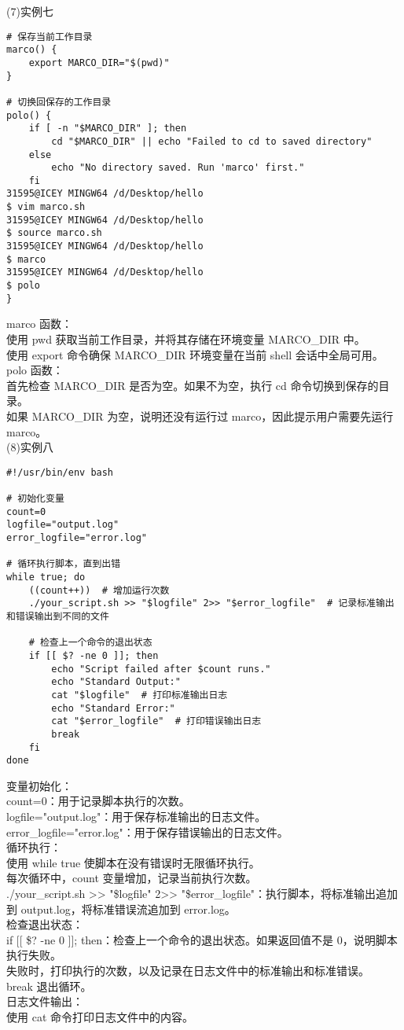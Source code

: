 \documentclass[a4paper, 12pt]{article}
\begin{document}
(7)实例七
\begin{Verbatim}
# 保存当前工作目录
marco() {
    export MARCO_DIR="$(pwd)"
}

# 切换回保存的工作目录
polo() {
    if [ -n "$MARCO_DIR" ]; then
        cd "$MARCO_DIR" || echo "Failed to cd to saved directory"
    else
        echo "No directory saved. Run 'marco' first."
    fi
31595@ICEY MINGW64 /d/Desktop/hello
$ vim marco.sh
31595@ICEY MINGW64 /d/Desktop/hello
$ source marco.sh
31595@ICEY MINGW64 /d/Desktop/hello
$ marco
31595@ICEY MINGW64 /d/Desktop/hello
$ polo
}
\end{Verbatim}
{\color{blue}
marco 函数：\\
使用 pwd 获取当前工作目录，并将其存储在环境变量 MARCO\_DIR 中。\\
使用 export 命令确保 MARCO\_DIR 环境变量在当前 shell 会话中全局可用。\\

polo 函数：\\
首先检查 MARCO\_DIR 是否为空。如果不为空，执行 cd 命令切换到保存的目录。\\
如果 MARCO\_DIR 为空，说明还没有运行过 marco，因此提示用户需要先运行 marco。\\
}
(8)实例八
\begin{Verbatim}
#!/usr/bin/env bash

# 初始化变量
count=0
logfile="output.log"
error_logfile="error.log"

# 循环执行脚本，直到出错
while true; do
    ((count++))  # 增加运行次数
    ./your_script.sh >> "$logfile" 2>> "$error_logfile"  # 记录标准输出和错误输出到不同的文件
    
    # 检查上一个命令的退出状态
    if [[ $? -ne 0 ]]; then
        echo "Script failed after $count runs."
        echo "Standard Output:"
        cat "$logfile"  # 打印标准输出日志
        echo "Standard Error:"
        cat "$error_logfile"  # 打印错误输出日志
        break
    fi
done
\end{Verbatim}
{\color{blue}
变量初始化：\\
count=0：用于记录脚本执行的次数。\\
logfile="output.log"：用于保存标准输出的日志文件。\\
error\_logfile="error.log"：用于保存错误输出的日志文件。\\

循环执行：\\
使用 while true 使脚本在没有错误时无限循环执行。\\
每次循环中，count 变量增加，记录当前执行次数。\\
./your\_script.sh >> "\$logfile" 2>> "\$error\_logfile"：执行脚本，将标准输出追加到 output.log，将标准错误流追加到 error.log。\\

检查退出状态：\\
if [[ \$? -ne 0 ]]; then：检查上一个命令的退出状态。如果返回值不是 0，说明脚本执行失败。\\
失败时，打印执行的次数，以及记录在日志文件中的标准输出和标准错误。\\
break 退出循环。\\

日志文件输出：\\
使用 cat 命令打印日志文件中的内容。\\
}
\end{document}
